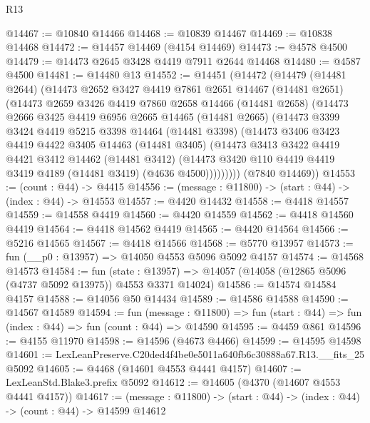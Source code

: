 \begin{lexlean}{R13}
\begin{coremodule}
@14467 := @10840 @14466
@14468 := @10839 @14467
@14469 := @10838 @14468
@14472 := @14457 @14469 (@4154 @14469)
@14473 := @4578 @4500
@14479 := @14473 @2645 @3428 @4419 @7911 @2644 @14468
@14480 := @4587 @4500
@14481 := @14480 @13
@14552 := @14451
    (@14472
      (@14479
        (@14481 @2644)
        (@14473
          @2652
          @3427
          @4419
          @7861
          @2651
          @14467
          (@14481 @2651)
          (@14473
            @2659
            @3426
            @4419
            @7860
            @2658
            @14466
            (@14481 @2658)
            (@14473
              @2666
              @3425
              @4419
              @6956
              @2665
              @14465
              (@14481 @2665)
              (@14473
                @3399
                @3424
                @4419
                @5215
                @3398
                @14464
                (@14481 @3398)
                (@14473
                  @3406
                  @3423
                  @4419
                  @4422
                  @3405
                  @14463
                  (@14481 @3405)
                  (@14473
                    @3413
                    @3422
                    @4419
                    @4421
                    @3412
                    @14462
                    (@14481 @3412)
                    (@14473 @3420 @110 @4419 @4419 @3419 @4189 (@14481 @3419) (@4636 @4500)))))))))
      (@7840 @14469))
@14553 := (count : @44) -> @4415
@14556 := (message : @11800) -> (start : @44) -> (index : @44) -> @14553
@14557 := @4420 @14432
@14558 := @4418 @14557
@14559 := @14558 @4419
@14560 := @4420 @14559
@14562 := @4418 @14560 @4419
@14564 := @4418 @14562 @4419
@14565 := @4420 @14564
@14566 := @5216 @14565
@14567 := @4418 @14566
@14568 := @5770 @13957
@14573 := fun (__p0 : @13957) => @14050 @4553 @5096 @5092 @4157
@14574 := @14568 @14573
@14584 := fun (state : @13957) =>
  @14057 (@14058 (@12865 @5096 (@4737 @5092 @13975)) @4553 @3371 @14024)
@14586 := @14574 @14584 @4157
@14588 := @14056 @50 @14434
@14589 := @14586 @14588
@14590 := @14567 @14589
@14594 := fun (message : @11800) =>
  fun (start : @44) => fun (index : @44) => fun (count : @44) => @14590
@14595 := @4459 @861
@14596 := @4155 @11970
@14598 := @14596 (@4673 @4466)
@14599 := @14595 @14598
@14601 := LexLeanPreserve.C20ded4f4be0e5011a640fb6c30888a67.R13.__fits_25 @5092
@14605 := @4468 (@14601 @4553 @4441 @4157)
@14607 := LexLeanStd.Blake3.prefix @5092
@14612 := @14605 (@4370 (@14607 @4553 @4441 @4157))
@14617 := (message : @11800) -> (start : @44) -> (index : @44) -> (count : @44) -> @14599 @14612

\end{coremodule}
\end{lexlean}
